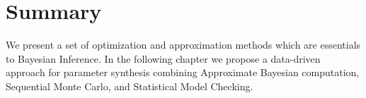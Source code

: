 \section{Summary}
We present a set of optimization and approximation methods which are essentials to Bayesian
Inference. In the following chapter we propose a data-driven approach for parameter synthesis
combining Approximate Bayesian computation, Sequential Monte Carlo, and Statistical Model Checking.
